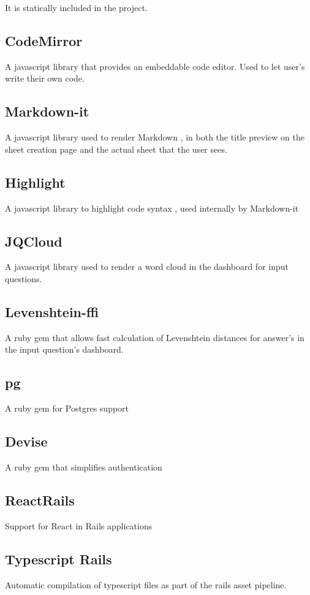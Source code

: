	It is statically included in the project.
	
\subsection{CodeMirror}
A javascript library that provides an embeddable code editor. Used to let user's write their own code.

\subsection{Markdown-it}
A javascript library used to render Markdown , in both the title preview on the sheet creation page and the actual sheet that the user sees.

\subsection{Highlight}
A javascript library to highlight code syntax , used internally by Markdown-it
	
\subsection{JQCloud}
A javascript library used to render a word cloud in the dashboard for input questions.

\subsection{Levenshtein-ffi}
A ruby gem that allows fast calculation of Levenshtein distances for answer's in the input question's dashboard.

\subsection{pg}
A ruby gem for Postgres support

\subsection{Devise}
A ruby gem that simplifies authentication

\subsection{ReactRails}
Support for React in Rails applications

\subsection{Typescript Rails}
Automatic compilation of typescript files as part of the rails asset pipeline.

